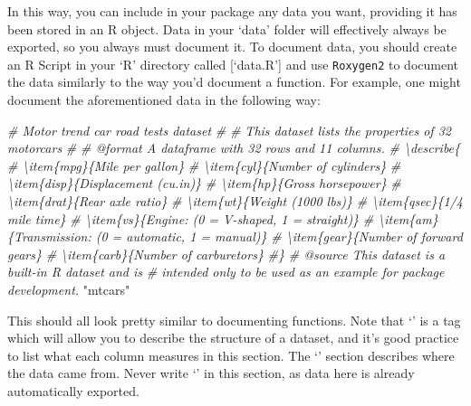 \documentclass[
]{book}
\newenvironment{Shaded}{\begin{snugshade}}{\end{snugshade}}
\newcommand{\CommentTok}[1]{\textcolor[rgb]{0.56,0.35,0.01}{\textit{#1}}}
\newcommand{\StringTok}[1]{\textcolor[rgb]{0.31,0.60,0.02}{#1}}
\begin{document}
In this way, you can include in your package any data you want, providing it has been stored in an R object. Data in your `data' folder will effectively always be exported, so you always must document it. To document data, you should create an R Script in your `R' directory called {[}`data.R'{]} and use \texttt{Roxygen2} to document the data similarly to the way you'd document a function. For example, one might document the aforementioned data in the following way:

\begin{Shaded}
\begin{Highlighting}[]
\CommentTok{\#\textquotesingle{} Motor trend car road tests dataset}
\CommentTok{\#\textquotesingle{}}
\CommentTok{\#\textquotesingle{} This dataset lists the properties of 32 motorcars}
\CommentTok{\#\textquotesingle{}}
\CommentTok{\#\textquotesingle{} @format A dataframe with 32 rows and 11 columns.}
\CommentTok{\#\textquotesingle{} \textbackslash{}describe\{}
\CommentTok{\#\textquotesingle{}   \textbackslash{}item\{mpg\}\{Mile per gallon\}}
\CommentTok{\#\textquotesingle{}   \textbackslash{}item\{cyl\}\{Number of cylinders\}}
\CommentTok{\#\textquotesingle{}   \textbackslash{}item\{disp\}\{Displacement (cu.in)\}}
\CommentTok{\#\textquotesingle{}   \textbackslash{}item\{hp\}\{Gross horsepower\}}
\CommentTok{\#\textquotesingle{}   \textbackslash{}item\{drat\}\{Rear axle ratio\}}
\CommentTok{\#\textquotesingle{}   \textbackslash{}item\{wt\}\{Weight (1000 lbs)\}}
\CommentTok{\#\textquotesingle{}   \textbackslash{}item\{qsec\}\{1/4 mile time\}}
\CommentTok{\#\textquotesingle{}   \textbackslash{}item\{vs\}\{Engine: (0 = V{-}shaped, 1 = straight)\}}
\CommentTok{\#\textquotesingle{}   \textbackslash{}item\{am\}\{Transmission: (0 = automatic, 1 = manual)\}}
\CommentTok{\#\textquotesingle{}   \textbackslash{}item\{gear\}\{Number of forward gears\}}
\CommentTok{\#\textquotesingle{}   \textbackslash{}item\{carb\}\{Number of carburetors\}}
\CommentTok{\#\textquotesingle{}\}}
\CommentTok{\#\textquotesingle{} @source This dataset is a built{-}in R dataset and is}
\CommentTok{\#\textquotesingle{} intended only to be used as an example for package development.}
\StringTok{"mtcars"}
\end{Highlighting}
\end{Shaded}

This should all look pretty similar to documenting functions. Note that `\citet{format}' is a tag which will allow you to describe the structure of a dataset, and it's good practice to list what each column measures in this section. The `\citet{source}' section describes where the data came from. Never write `\citet{export}' in this section, as data here is already automatically exported.
\end{document}
